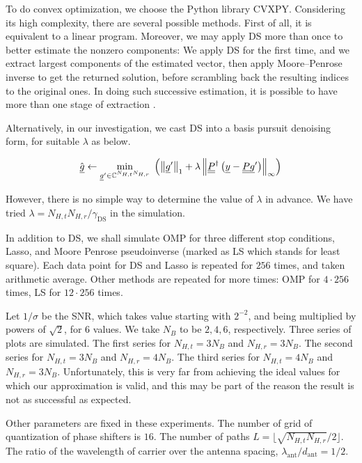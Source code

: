\documentclass[journal]{IEEEtran}
\newcommand {\g} {\gamma}
\renewcommand {\l} {\lambda}
\newcommand {\s} {\sigma}
\newcommand {\D} {\cdot}
\newcommand {\Adj} {\dagger}
\newcommand {\m} [1] {\( #1 \)}
\newcommand {\V} [1] {\underline {#1}}
\newcommand {\M} [1] {\underline {\underline {#1}}}
\newcommand {\RB} [1] {\left( #1 \right)}
\newcommand {\VNm} [1] {\left \Vert #1 \right \Vert}
\newcommand {\R} [1] {\sqrt {#1}}
\newcommand {\Min} [1] {\underset {#1} {\mathrm {min}}\;}
\newcommand {\Disp} [1] {
   \begin {align*}
      #1
   \end {align*}
}
\begin{document}
To do convex optimization, we choose the Python library CVXPY.
Considering its high complexity, there are several possible methods.
First of all, it is equivalent to a linear program.
Moreover, we may apply DS more than once to better estimate the nonzero components:
We apply DS for the first time, and we extract largest components of the estimated vector, then apply Moore–Penrose inverse to get the returned solution, before scrambling back the resulting indices to the original ones.
In doing such successive estimation, it is possible to have more than one stage of extraction \cite {CaT07}.

Alternatively, in our investigation, we cast DS into a basis pursuit denoising form, for suitable \m {\l} \cite {BoV04} as below.

\Disp {
\Hat {\V {g}}
\leftarrow \Min {\V {g}' \in \mathbb {C} ^{N_{H,t} N_{H,r}}}
\RB {\VNm {\V {g}'} _1 + \l \VNm {\M {P}^\Adj \RB {\V {y} -\M {P} \V {g}'}} _\infty}
}

However, there is no simple way to determine the value of \m {\l} in advance.
We have tried \m {\l = N_{H,t} N_{H,r} / \g_{\mathrm {DS}}} in the simulation.

In addition to DS, we shall simulate OMP for three different stop conditions, Lasso, and Moore Penrose pseudoinverse (marked as LS which stands for least square).
Each data point for DS and Lasso is repeated for \m {256} times, and taken arithmetic average.
Other methods are repeated for more times: OMP for \m {4 \D 256} times, LS for \m {12 \D 256} times.

Let \m {1/\s} be the SNR, which takes value starting with \m {2^{-2}}, and being multiplied by powers of \m {\R {2}}, for \m {6} values.
We take \m {N_B} to be \m {2, 4, 6}, respectively.
Three series of plots are simulated.
The first series for \m {N_{H,t} = 3 N_B} and \m {N_{H,r} = 3 N_B}.
The second series for \m {N_{H,t} = 3 N_B} and \m {N_{H,r} = 4 N_B}.
The third series for \m {N_{H,t} = 4 N_B} and \m {N_{H,r} = 3 N_B}.
Unfortunately, this is very far from achieving the ideal values for which our approximation is valid, and this may be part of the reason the result is not as successful as expected.

Other parameters are fixed in these experiments.
The number of grid of quantization of phase shifters is \m {16}.
The number of paths \m {L = \lfloor \R {N_{H,t} N_{H,r}} / 2 \rfloor}.
The ratio of the wavelength of carrier over the antenna spacing, \m {\l _{\mathrm {ant}} / d _{\mathrm {ant}} = 1 / 2}.
\end{document}
